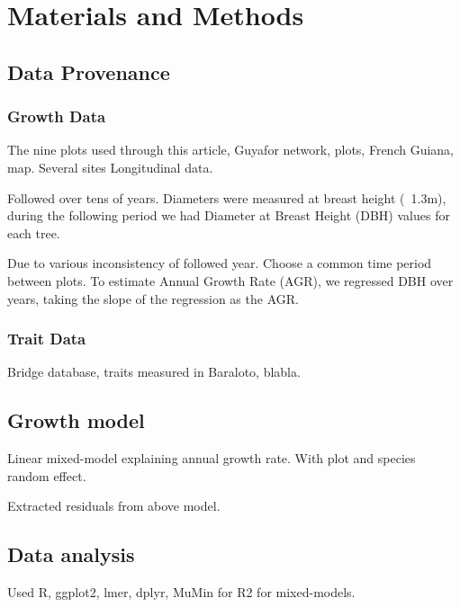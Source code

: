\section*{Materials and Methods}
\label{sec:M&M}

\subsection*{Data Provenance}

\subsubsection*{Growth Data}
The nine plots used through this article,
Guyafor network, plots,
French Guiana, map. Several sites
Longitudinal data.

Followed over tens of years. Diameters were measured at breast height (~1.3m), during the following period we had Diameter at Breast Height (DBH) values for each tree.

Due to various inconsistency of followed year. Choose a common time period between plots. To estimate Annual Growth Rate (AGR), we regressed DBH over years, taking the slope of the regression as the AGR.

\subsubsection*{Trait Data}

Bridge database, traits measured in Baraloto, blabla.

\subsection*{Growth model}

Linear mixed-model explaining annual growth rate. With plot and species random effect.

Extracted residuals from above model.

\subsection*{Data analysis}

Used R, ggplot2, lmer, dplyr, MuMin for R2 for mixed-models.